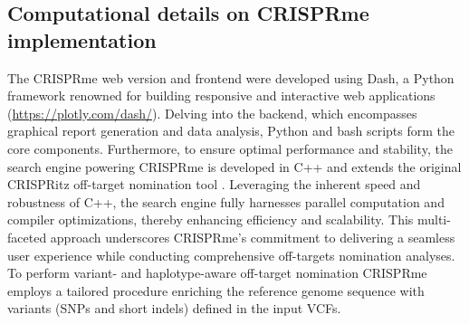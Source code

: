\documentclass[a4paper, titlepage, openright]{book}
\newcommand{\crisprme}{CRISPRme\xspace}
\begin{document}
\subsection{Computational details on \crisprme implementation}
The \crisprme web version and frontend were developed using Dash, a Python framework renowned for building responsive and interactive web applications (\url{https://plotly.com/dash/}). Delving into the backend, which encompasses graphical report generation and data analysis, Python and bash scripts form the core components. Furthermore, to ensure optimal performance and stability, the search engine powering \crisprme is developed in C++ and extends the original CRISPRitz off-target nomination tool \citep{cancellieri2020crispritz}. Leveraging the inherent speed and robustness of C++, the search engine fully harnesses parallel computation and compiler optimizations, thereby enhancing efficiency and scalability. This multi-faceted approach underscores \crisprme's commitment to delivering a seamless user experience while conducting comprehensive off-targets nomination analyses. To perform variant- and haplotype-aware off-target nomination \crisprme employs a tailored procedure enriching the reference genome sequence with variants (SNPs and short indels) defined in the input VCFs.

\end{document}
